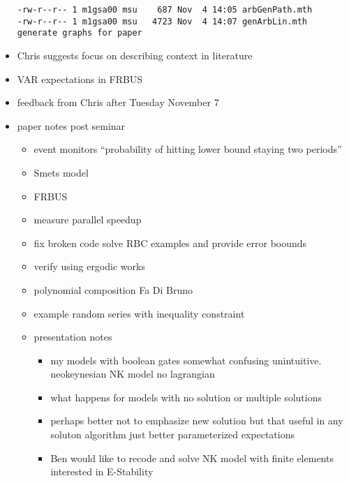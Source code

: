 \documentclass[hyperref]{labbook}
\begin{document}
\begin{itemize}
\begin{verbatim}
-rw-r--r-- 1 m1gsa00 msu    687 Nov  4 14:05 arbGenPath.mth
-rw-r--r-- 1 m1gsa00 msu   4723 Nov  4 14:07 genArbLin.mth 
generate graphs for paper
\end{verbatim}
  \item Chris suggests focus on describing context in literature
\item VAR expectations in FRBUS
\item feedback from Chris after Tuesday November 7
\item paper notes post seminar
  \begin{itemize}
  \item event monitors 
``probability of hitting lower bound staying two periods''
  \item Smets model
  \item FRBUS
  \item measure parallel speedup
  \item fix broken code solve RBC examples and provide error boounds
  \item verify using ergodic works
  \item polynomial composition Fa Di Bruno
  \item example random series with inequality constraint
  \item presentation notes
    \begin{itemize}
    \item my models with boolean gates somewhat confusing unintuitive.
neokeynesian NK model no lagrangian
\item what happens for models with no solution or multiple solutions
\item perhaps better not to emphasize new solution but that useful in any soluton algorithm  just better parameterized expectations
\item Ben would like to recode and solve NK model with finite elements interested in E-Stability 
    \end{itemize}
  \end{itemize}

\end{itemize}



\end{document}
